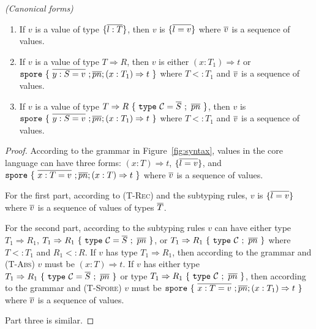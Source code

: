 \begin{lemma}
\emph{(Canonical forms)}
\label{lem:canonical}
\begin{enumerate}

\item If $v$ is a value of type $\{ \overline{l : T} \}$, then $v$ is $\{ \overline{l = v} \}$ where $\overline{v}$ is a sequence of values.

\item If $v$ is a value of type $T \Rightarrow R$, then $v$ is either $(x: T_1) \Rightarrow t$ or \\ $\texttt{spore}~\{~\overline{y : S = v}~; \overline{pn} ; (x: T_1) \Rightarrow t~\}$ where $T <: T_1$ and $\overline{v}$ is a sequence of values.

\item If $v$ is a value of type $T \Rightarrow R~\{~\texttt{type}~\mathcal{C} = \overline{S}~;~\overline{pn}~\}$, then $v$ is \\ $\texttt{spore}~\{~\overline{y : S = v}~; \overline{pn} ; (x: T_1) \Rightarrow t~\}$ where $T <: T_1$ and $\overline{v}$ is a sequence of values.


\end{enumerate}
\end{lemma}
\begin{proof}
According to the grammar in Figure~\ref{fig:syntax}, values in the core language can have three forms: $(x: T) \Rightarrow t$, $\{ \overline{l = v} \}$, and $\texttt{spore}~\{~\overline{x : T = v}~; \overline{pn} ; (x: T) \Rightarrow t~\}$ where $\overline{v}$ is a sequence of values.

For the first part, according to (\textsc{T-Rec}) and the subtyping rules, $v$ is $\{ \overline{l = v} \}$ where $\overline{v}$ is a sequence of values of types $\overline{T}$.

For the second part, according to the subtyping rules $v$ can have either type $T_1 \Rightarrow R_1$, $T_1 \Rightarrow R_1~\{~\texttt{type}~\mathcal{C} = \overline{S}~;~\overline{pn}~\}$, or $T_1 \Rightarrow R_1~\{~\texttt{type}~\mathcal{C}~;~\overline{pn}~\}$ where $T <: T_1$ and $R_1 <: R$. If $v$ has type $T_1 \Rightarrow R_1$, then according to the grammar and (\textsc{T-Abs}) $v$ must be $(x: T) \Rightarrow t$. If $v$ has either type $T_1 \Rightarrow R_1~\{~\texttt{type}~\mathcal{C} = \overline{S}~;~\overline{pn}~\}$ or type $T_1 \Rightarrow R_1~\{~\texttt{type}~\mathcal{C}~;~\overline{pn}~\}$, then according to the grammar and (\textsc{T-Spore}) $v$ must be $\texttt{spore}~\{~\overline{x : T = v}~; \overline{pn} ; (x: T_1) \Rightarrow t~\}$ where $\overline{v}$ is a sequence of values.

Part three is similar.
\end{proof}


